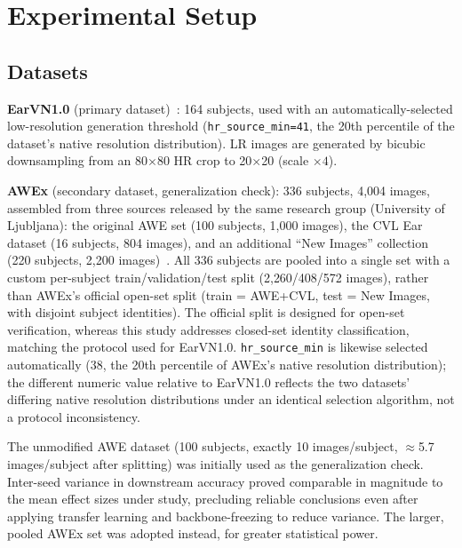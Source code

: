 \documentclass[11pt]{article}
\begin{document}
\section{Experimental Setup}
\label{sec:setup}

\subsection{Datasets}
\label{sec:datasets}

\textbf{EarVN1.0} (primary dataset)~\cite{hoang2019earvn}: 164 subjects, used with an automatically-selected low-resolution generation threshold (\texttt{hr\_source\_min=41}, the 20th percentile of the dataset's native resolution distribution). LR images are generated by bicubic downsampling from an 80$\times$80 HR crop to 20$\times$20 (scale $\times4$).

\textbf{AWEx} (secondary dataset, generalization check): 336 subjects, 4{,}004 images, assembled from three sources released by the same research group (University of Ljubljana): the original AWE set (100 subjects, 1{,}000 images), the CVL Ear dataset (16 subjects, 804 images), and an additional ``New Images'' collection (220 subjects, 2{,}200 images)~\cite{emersic2017ear}. All 336 subjects are pooled into a single set with a custom per-subject train/validation/test split (2{,}260/408/572 images), rather than AWEx's official open-set split (train = AWE+CVL, test = New Images, with disjoint subject identities). The official split is designed for open-set verification, whereas this study addresses closed-set identity classification, matching the protocol used for EarVN1.0. \texttt{hr\_source\_min} is likewise selected automatically (38, the 20th percentile of AWEx's native resolution distribution); the different numeric value relative to EarVN1.0 reflects the two datasets' differing native resolution distributions under an identical selection algorithm, not a protocol inconsistency.

The unmodified AWE dataset (100 subjects, exactly 10 images/subject, $\approx$5.7 images/subject after splitting) was initially used as the generalization check. Inter-seed variance in downstream accuracy proved comparable in magnitude to the mean effect sizes under study, precluding reliable conclusions even after applying transfer learning and backbone-freezing to reduce variance. The larger, pooled AWEx set was adopted instead, for greater statistical power.
\end{document}
